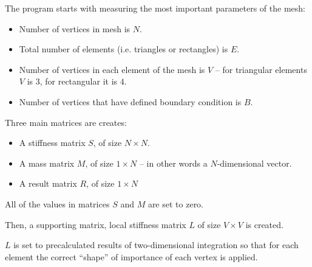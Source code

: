 \documentclass[a4paper,12pt]{article}
\begin{document}
The program starts with measuring the most important parameters of the mesh:

\begin{itemize}

  \item Number of vertices in mesh is $N$.

  \item Total number of elements (i.e. triangles or rectangles) is $E$.

  \item Number of vertices in each element of the mesh is $V$ -- for triangular elements $V$ is $3$, for rectangular it
  is $4$.

  \item Number of vertices that have defined boundary condition is $B$.

\end{itemize}

Three main matrices are creates:

\begin{itemize}

  \item A stiffness matrix $S$, of size $N \times N$.

  \item A mass matrix $M$, of size $1 \times N$ -- in other words a $N$-dimensional vector.

  \item A result matrix $R$, of size $1 \times N$

\end{itemize}

All of the values in matrices $S$ and $M$ are set to zero.

Then, a supporting matrix, local stiffness matrix $L$ of size $V \times V$ is created.

$L$ is set to precalculated results of two-dimensional integration so that for each element the correct ``shape'' of
importance of each vertex is applied.
\end{document}
